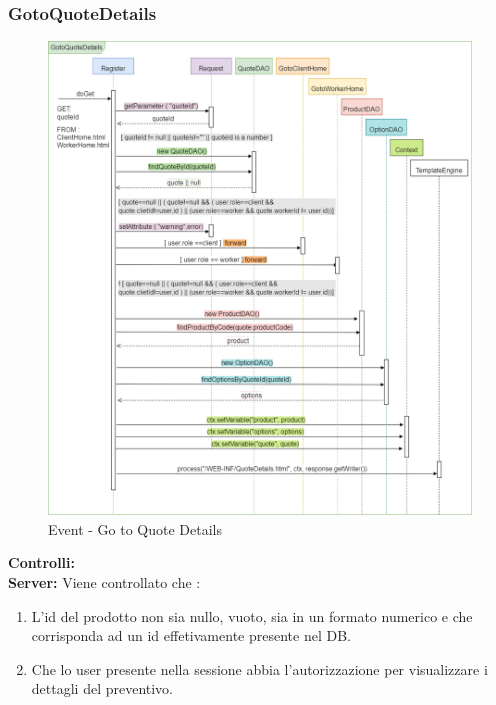 \documentclass[a4paper, 12pt]{article}
\begin{document}
\subsubsection{GotoQuoteDetails}
\begin{figure}[h!]
	\centering
	\includegraphics[width=1\textwidth]{PureHTML_images/GotoQuoteDetails.png}
	\caption{Event - Go to Quote Details}
	\label{figure:gotoquotedetails_sd}
\end{figure}
\noindent \textbf{Controlli:}\\
\noindent \textbf{Server:} 
\noindent Viene controllato che :
\begin{enumerate}
\item L'id del prodotto non sia nullo, vuoto, sia in un formato numerico e che corrisponda ad un id effetivamente presente nel DB.
\item Che lo user presente nella sessione abbia l'autorizzazione per visualizzare i dettagli del preventivo.
\end{enumerate}
\newpage
\end{document}
